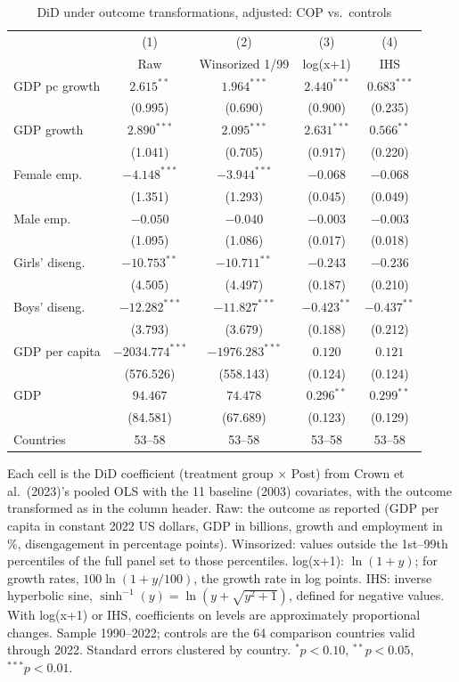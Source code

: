 \begin{table}[htbp]
\centering
\caption{DiD under outcome transformations, adjusted: COP vs.\ controls}
\label{tab:crown_did_transform_cop}
\begin{tabular}{lcccc}
\toprule
 & (1) & (2) & (3) & (4) \\
 & Raw & Winsorized 1/99 & log(x+1) & IHS \\
\midrule
GDP pc growth & $2.615^{**}$ & $1.964^{***}$ & $2.440^{***}$ & $0.683^{***}$ \\
 & (0.995) & (0.690) & (0.900) & (0.235) \\
GDP growth & $2.890^{***}$ & $2.095^{***}$ & $2.631^{***}$ & $0.566^{**}$ \\
 & (1.041) & (0.705) & (0.917) & (0.220) \\
Female emp. & $-4.148^{***}$ & $-3.944^{***}$ & $-0.068$ & $-0.068$ \\
 & (1.351) & (1.293) & (0.045) & (0.049) \\
Male emp. & $-0.050$ & $-0.040$ & $-0.003$ & $-0.003$ \\
 & (1.095) & (1.086) & (0.017) & (0.018) \\
Girls' diseng. & $-10.753^{**}$ & $-10.711^{**}$ & $-0.243$ & $-0.236$ \\
 & (4.505) & (4.497) & (0.187) & (0.210) \\
Boys' diseng. & $-12.282^{***}$ & $-11.827^{***}$ & $-0.423^{**}$ & $-0.437^{**}$ \\
 & (3.793) & (3.679) & (0.188) & (0.212) \\
GDP per capita & $-2034.774^{***}$ & $-1976.283^{***}$ & $0.120$ & $0.121$ \\
 & (576.526) & (558.143) & (0.124) & (0.124) \\
GDP & $94.467$ & $74.478$ & $0.296^{**}$ & $0.299^{**}$ \\
 & (84.581) & (67.689) & (0.123) & (0.129) \\
\midrule
Countries & 53--58 & 53--58 & 53--58 & 53--58 \\
\bottomrule
\end{tabular}
\par\vspace{4pt}
\begin{minipage}{\textwidth}\footnotesize Each cell is the DiD coefficient (treatment group $\times$ Post) from Crown et al.\ (2023)'s pooled OLS with the 11 baseline (2003) covariates, with the outcome transformed as in the column header. Raw: the outcome as reported (GDP per capita in constant 2022 US dollars, GDP in billions, growth and employment in \%, disengagement in percentage points). Winsorized: values outside the 1st--99th percentiles of the full panel set to those percentiles. log(x+1): $\ln(1 + y)$; for growth rates, $100 \ln(1 + y/100)$, the growth rate in log points. IHS: inverse hyperbolic sine, $\sinh^{-1}(y) = \ln(y + \sqrt{y^2 + 1})$, defined for negative values. With log(x+1) or IHS, coefficients on levels are approximately proportional changes. Sample 1990--2022; controls are the 64 comparison countries valid through 2022. Standard errors clustered by country. $^{*}p<0.10$, $^{**}p<0.05$, $^{***}p<0.01$.\end{minipage}
\end{table}
